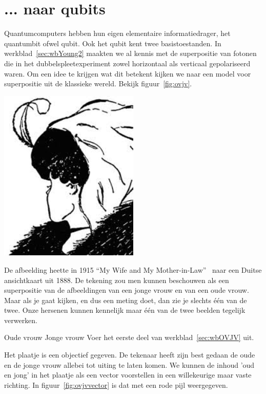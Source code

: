 \documentclass[../../main.tex]{subfiles}
\begin{document}
\section{... naar qubits}\label{sec:qubit}
Quantumcomputers hebben hun eigen elementaire informatiedrager, het quantumbit ofwel qubit. Ook het qubit kent twee basistoestanden. In werkblad~\ref{sec:wbYoung2} maakten we al kennis met de superpositie van fotonen die in het dubbelspleetexperiment zowel horizontaal als verticaal gepolariseerd waren. Om een idee te krijgen wat dit betekent kijken we naar een model voor superpositie uit de klassieke wereld. Bekijk figuur~\ref{fig:ovjv}. 

\begin{center}
\leavevmode
\includegraphics[width=0.5\textwidth]{./img/ovjv.png}
\end{center}

De afbeelding heette in 1915 ``My Wife and My Mother-in-Law''~\cite{Hill1915} naar een Duitse ansichtkaart uit 1888. De tekening zou men kunnen beschouwen als een superpositie van de afbeeldingen van een jonge vrouw en van een oude vrouw. Maar als je gaat kijken, en dus een meting doet,  dan zie je slechts \'e\'en van de twee. 
Onze hersenen kunnen kennelijk maar \'e\'en van de twee beelden tegelijk verwerken. 

\begin{experiment}{Oude vrouw Jonge vrouw}
Voer het eerste deel van werkblad~\ref{sec:wbOVJV} uit.
\end{experiment}

Het plaatje is een objectief gegeven. De tekenaar heeft zijn best gedaan de oude en de jonge vrouw allebei tot uiting te laten komen. We kunnen de inhoud 'oud en jong' in het plaatje als een vector voorstellen in een willekeurige maar vaste richting. In figuur~\ref{fig:ovjvvector} is dat met een rode pijl weergegeven.
\end{document}
